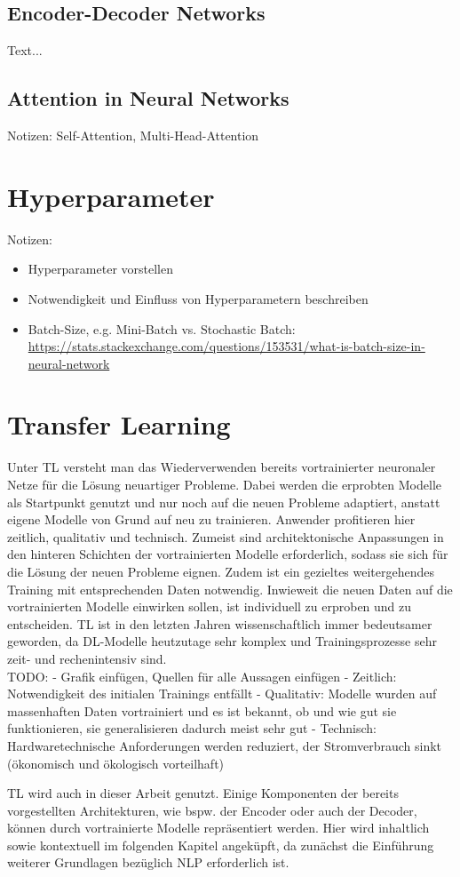 \subsection{Encoder-Decoder Networks}
Text...


\subsection{Attention in Neural Networks}
Notizen: Self-Attention, Multi-Head-Attention


\section{Hyperparameter}
Notizen:
\begin{itemize}
	\item Hyperparameter vorstellen
	\item Notwendigkeit und Einfluss von Hyperparametern beschreiben
	\item Batch-Size, e.g. Mini-Batch vs. Stochastic Batch: \url{https://stats.stackexchange.com/questions/153531/what-is-batch-size-in-neural-network}
\end{itemize}


\section{Transfer Learning}
Unter \ac{TL} versteht man das Wiederverwenden bereits vortrainierter neuronaler Netze für die Lösung neuartiger Probleme. Dabei werden die erprobten Modelle als Startpunkt genutzt und nur noch auf die neuen Probleme adaptiert, anstatt eigene Modelle von Grund auf neu zu trainieren. Anwender profitieren hier zeitlich, qualitativ und technisch. Zumeist sind architektonische Anpassungen in den hinteren Schichten der vortrainierten Modelle erforderlich, sodass sie sich für die Lösung der neuen Probleme eignen. Zudem ist ein gezieltes weitergehendes Training mit entsprechenden Daten notwendig. Inwieweit die neuen Daten auf die vortrainierten Modelle einwirken sollen, ist individuell zu erproben und zu entscheiden. \ac{TL} ist in den letzten Jahren wissenschaftlich immer bedeutsamer geworden, da \ac{DL}-Modelle heutzutage sehr komplex und Trainingsprozesse sehr zeit- und rechenintensiv sind.\\

TODO:
- Grafik einfügen, Quellen für alle Aussagen einfügen
- Zeitlich: Notwendigkeit des initialen Trainings entfällt
- Qualitativ: Modelle wurden auf massenhaften Daten vortrainiert und es ist bekannt, ob und wie gut sie funktionieren, sie generalisieren dadurch meist sehr gut
- Technisch: Hardwaretechnische Anforderungen werden reduziert, der Stromverbrauch sinkt (ökonomisch und ökologisch vorteilhaft)

\ac{TL} wird auch in dieser Arbeit genutzt. Einige Komponenten der bereits vorgestellten Architekturen, wie bspw. der Encoder oder auch der Decoder, können durch vortrainierte Modelle repräsentiert werden. Hier wird inhaltlich sowie kontextuell im folgenden Kapitel angeküpft, da zunächst die Einführung weiterer Grundlagen bezüglich \ac{NLP} erforderlich ist.
